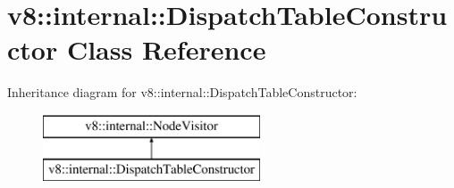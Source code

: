 \hypertarget{classv8_1_1internal_1_1_dispatch_table_constructor}{}\section{v8\+:\+:internal\+:\+:Dispatch\+Table\+Constructor Class Reference}
\label{classv8_1_1internal_1_1_dispatch_table_constructor}
Inheritance diagram for v8\+:\+:internal\+:\+:Dispatch\+Table\+Constructor\+:\begin{figure}[H]
\begin{center}
\leavevmode
\includegraphics[height=2.000000cm]{classv8_1_1internal_1_1_dispatch_table_constructor}
\end{center}
\end{figure}
